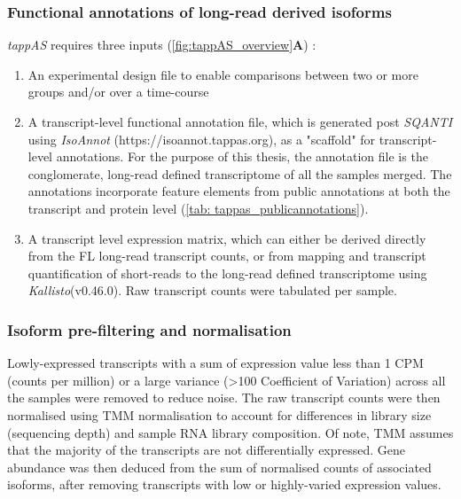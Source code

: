 \subsubsection{Functional annotations of long-read derived isoforms}
\textit{tappAS} requires three inputs (\cref{fig:tappAS_overview}\textbf{A}) :
\begin{enumerate}
	\item An experimental design file to enable comparisons between two or more groups and/or over a time-course 
	\item A transcript-level functional annotation file, which is generated post \textit{SQANTI} using \textit{IsoAnnot} (https://isoannot.tappas.org), as a "scaffold" for transcript-level annotations. For the purpose of this thesis, the annotation file is the conglomerate, long-read defined transcriptome of all the samples merged. The annotations incorporate feature elements from public annotations at both the transcript and protein level (\cref{tab: tappas_publicannotations}). 
	\item A transcript level expression matrix, which can either be derived directly from the FL long-read transcript counts, or from mapping and transcript quantification of short-reads to the long-read defined transcriptome using \textit{Kallisto}(v0.46.0). Raw transcript counts were tabulated per sample.  	 
\end{enumerate}


\subsubsection{Isoform pre-filtering and normalisation}
Lowly-expressed transcripts with a sum of expression value less than 1 CPM (counts per million) or a large variance (>100 Coefficient of Variation) across all the samples were removed to reduce noise. The raw transcript counts were then normalised using TMM normalisation \cite{Robinson2010} to account for differences in library size (sequencing depth) and sample RNA library composition. Of note, TMM assumes that the majority of the transcripts are not differentially expressed. Gene abundance was then deduced from the sum of normalised counts of associated isoforms, after removing transcripts with low or highly-varied expression values.     


